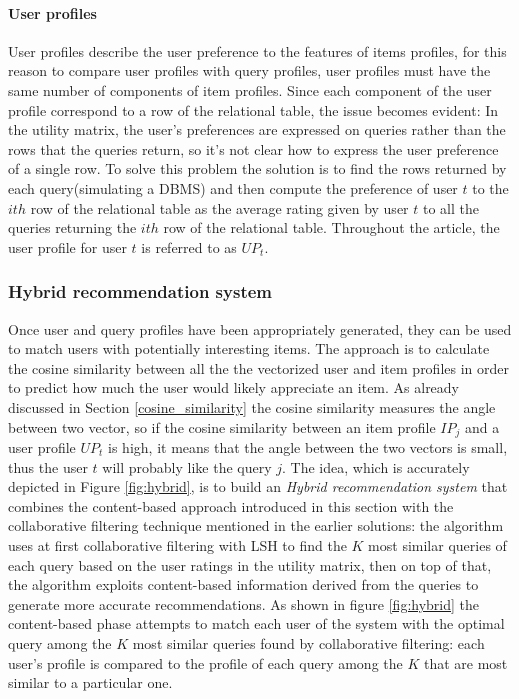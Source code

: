 \paragraph{User profiles} User profiles describe the user preference to the features of items profiles, for this reason to compare user profiles with query profiles, user profiles must have the same number of components of item profiles. Since each component of the user profile correspond to a row of the relational table, the issue becomes evident: In the utility matrix, the user's preferences are expressed on queries rather than the rows that the queries return, so it's not clear how to express the user preference of a single row. To solve this problem the solution is to find the rows returned by each query(simulating a DBMS) and then compute the preference of user $t$ to the $ith$ row of the relational table as the average rating given by user $t$ to all the queries returning the $ith$ row of the relational table. Throughout the article, the user profile for user $t$ is referred to as $UP_t$. 


\subsubsection{Hybrid recommendation system} 
Once user and query profiles have been appropriately generated, they can be used to match users with potentially interesting items. The approach is to calculate the cosine similarity between all the the vectorized user and item profiles in order to predict how much the user would likely appreciate an item. As already discussed in Section \ref{cosine_similarity} the cosine similarity measures the angle between two vector, so if the cosine similarity between an item profile $IP_j$ and a user profile $UP_t$ is high, it means that the angle between the two vectors is small, thus the user $t$ will probably like the query $j$. %
The idea, which is accurately depicted in Figure \ref{fig:hybrid}, is to build an \emph{Hybrid recommendation system} that combines the content-based approach introduced in this section with the collaborative filtering technique mentioned in the earlier solutions: the algorithm uses at first collaborative filtering with LSH to find the $K$ most similar queries of each query based on the user ratings in the utility matrix, then on top of that, the algorithm exploits content-based information derived from the queries to generate more accurate recommendations. As shown in figure \ref{fig:hybrid} the content-based phase attempts to match each user of the system with the optimal query among the $K$ most similar queries found by collaborative filtering: each user's profile is compared to the profile of each query among the $K$ that are most similar to a particular one. 

